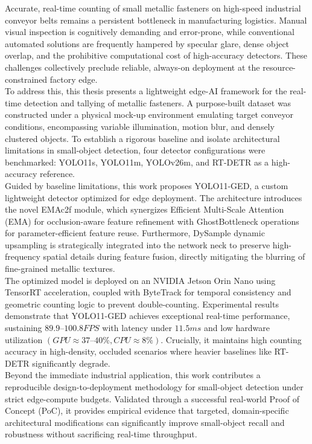 Accurate, real-time counting of small metallic fasteners on high-speed industrial conveyor belts remains a persistent bottleneck in manufacturing logistics. Manual visual inspection is cognitively demanding and error-prone, while conventional automated solutions are frequently hampered by specular glare, dense object overlap, and the prohibitive computational cost of high-accuracy detectors. These challenges collectively preclude reliable, always-on deployment at the resource-constrained factory edge.\\

To address this, this thesis presents a lightweight edge-AI framework for the real-time detection and tallying of metallic fasteners. A purpose-built dataset was constructed under a physical mock-up environment emulating target conveyor conditions, encompassing variable illumination, motion blur, and densely clustered objects. To establish a rigorous baseline and isolate architectural limitations in small-object detection, four detector configurations were benchmarked: YOLO11s, YOLO11m, YOLOv26m, and RT-DETR as a high-accuracy reference.\\

Guided by baseline limitations, this work proposes YOLO11-GED, a custom lightweight detector optimized for edge deployment. The architecture introduces the novel EMAc2f module, which synergizes Efficient Multi-Scale Attention (EMA) for occlusion-aware feature refinement with GhostBottleneck operations for parameter-efficient feature reuse. Furthermore, DySample dynamic upsampling is strategically integrated into the network neck to preserve high-frequency spatial details during feature fusion, directly mitigating the blurring of fine-grained metallic textures.\\

The optimized model is deployed on an NVIDIA Jetson Orin Nano using TensorRT acceleration, coupled with ByteTrack for temporal consistency and geometric counting logic to prevent double-counting. Experimental results demonstrate that YOLO11-GED achieves exceptional real-time performance, sustaining $89.9–100.8 FPS$ with latency under $11.5 ms$ and low hardware utilization $(GPU \approx 37–40 \%, CPU \approx 8 \%)$. Crucially, it maintains high counting accuracy in high-density, occluded scenarios where heavier baselines like RT-DETR significantly degrade.\\

Beyond the immediate industrial application, this work contributes a reproducible design-to-deployment methodology for small-object detection under strict edge-compute budgets. Validated through a successful real-world Proof of Concept (PoC), it provides empirical evidence that targeted, domain-specific architectural modifications can significantly improve small-object recall and robustness without sacrificing real-time throughput.